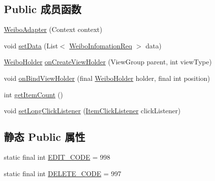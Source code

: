 \subsection*{Public 成员函数}
\begin{DoxyCompactItemize}
\item 
\mbox{\hyperlink{classcom_1_1example_1_1akisame__lin_1_1love__air2_1_1adapter_1_1_weibo_adapter_a291062dd8e6d6a6651a3ea0fb93a04d7}{Weibo\+Adapter}} (Context context)
\item 
void \mbox{\hyperlink{classcom_1_1example_1_1akisame__lin_1_1love__air2_1_1adapter_1_1_weibo_adapter_ac7ee4acf36b4f96167cca0f0d2dac2c9}{set\+Data}} (List$<$ \mbox{\hyperlink{classcom_1_1example_1_1akisame__lin_1_1love__air2_1_1bean1_1_1_weibo_infomation_req}{Weibo\+Infomation\+Req}} $>$ data)
\item 
\mbox{\hyperlink{classcom_1_1example_1_1akisame__lin_1_1love__air2_1_1adapter_1_1_weibo_adapter_1_1_weibo_holder}{Weibo\+Holder}} \mbox{\hyperlink{classcom_1_1example_1_1akisame__lin_1_1love__air2_1_1adapter_1_1_weibo_adapter_a68f71720129aa848d35e8c0aa96ec35d}{on\+Create\+View\+Holder}} (View\+Group parent, int view\+Type)
\item 
void \mbox{\hyperlink{classcom_1_1example_1_1akisame__lin_1_1love__air2_1_1adapter_1_1_weibo_adapter_af60a3c1008256d03b53dc3e2b7f80401}{on\+Bind\+View\+Holder}} (final \mbox{\hyperlink{classcom_1_1example_1_1akisame__lin_1_1love__air2_1_1adapter_1_1_weibo_adapter_1_1_weibo_holder}{Weibo\+Holder}} holder, final int position)
\item 
int \mbox{\hyperlink{classcom_1_1example_1_1akisame__lin_1_1love__air2_1_1adapter_1_1_weibo_adapter_aee7f12c6d34d8328682e6d46e1e456d7}{get\+Item\+Count}} ()
\item 
void \mbox{\hyperlink{classcom_1_1example_1_1akisame__lin_1_1love__air2_1_1adapter_1_1_weibo_adapter_a8f44fac730a2d8b79cd8e9fecb0b2edf}{set\+Long\+Click\+Listener}} (\mbox{\hyperlink{interfacecom_1_1example_1_1akisame__lin_1_1love__air2_1_1adapter_1_1_weibo_adapter_1_1_item_click_listener}{Item\+Click\+Listener}} click\+Listener)
\end{DoxyCompactItemize}
\subsection*{静态 Public 属性}
\begin{DoxyCompactItemize}
\item 
static final int \mbox{\hyperlink{classcom_1_1example_1_1akisame__lin_1_1love__air2_1_1adapter_1_1_weibo_adapter_a53c162675345927d1b1064f8bf8d11b9}{E\+D\+I\+T\+\_\+\+C\+O\+DE}} = 998
\item 
static final int \mbox{\hyperlink{classcom_1_1example_1_1akisame__lin_1_1love__air2_1_1adapter_1_1_weibo_adapter_ae3db49e9f312695536b4eaaeed886013}{D\+E\+L\+E\+T\+E\+\_\+\+C\+O\+DE}} = 997
\end{DoxyCompactItemize}
